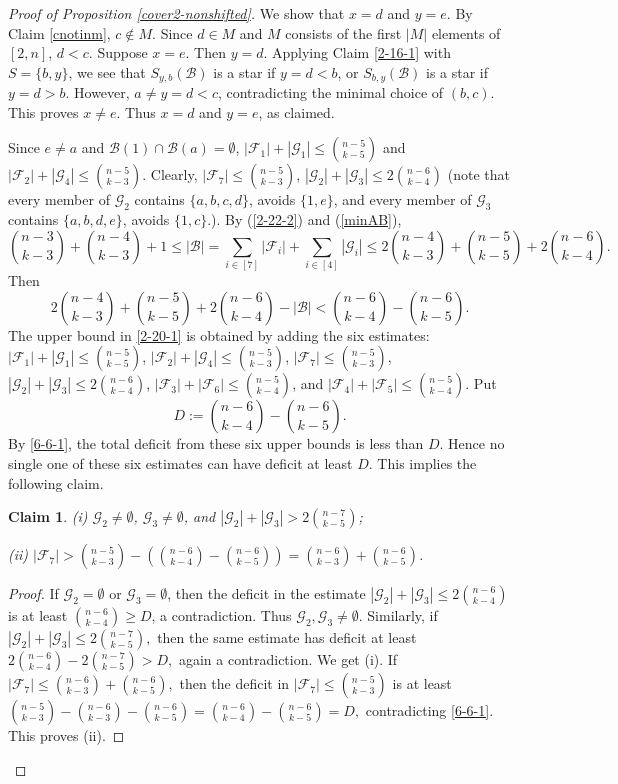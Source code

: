 \documentclass[a4paper,11pt]{article}
\newtheorem{claim}[theorem]{Claim}
\newcommand{\m}{\mathcal}
\begin{document}
\begin{proof}[Proof of Proposition \ref{cover2-nonshifted}]
We show that $x=d$ and $y=e.$ 
By Claim \ref{cnotinm}, $c\not\in M$. Since $d\in M$ and $M$ consists of the first $|M|$ elements of $[2,n]$, $d<c$. 
Suppose $x=e$. Then $y=d$. Applying Claim \ref{2-16-1} with $S=\{b,y\}$, we see that $S_{y,b}(\m B)$ is a star if $y=d<b$, or 
$S_{b,y}(\m B)$ is a star if $y=d>b$. However, $a\ne y=d<c$, contradicting the minimal choice of $(b,c)$. This proves $x\ne e$. Thus $x=d$ and $y=e$, as claimed.  

Since $e\ne a$ and $\m B(1)\cap \m B(a)=\emptyset$, $|\m F_1|+|\m G_1|\le {n-5\choose k-5}$ and $|\m F_2|+|\m G_4|\le {n-5\choose k-3}$.
Clearly, $|\m F_7|\le {n-5\choose k-3}$, $|\m G_2|+|\m G_3|\le 2 {n-6\choose k-4}$ (note that every member of $\mathcal G_2$ contains $\{a,b,c,d\}$, avoids
$\{1,e\}$, and every member of $\mathcal G_3$ contains
$\{a,b,d,e\}$, avoids $\{1,c\}$.).
By (\ref{2-22-2}) and (\ref{minAB}),  
\begin{equation}\label{2-20-1}
   {n-3\choose k-3}+{n-4\choose k-3}+1 \le |\m B|=\sum_{i\in [7]}|\m F_i|+\sum_{i\in [4]}|\m G_i|\le 2{n-4\choose k-3}+{n-5\choose k-5}+2{n-6\choose k-4}.
\end{equation}
Then
\begin{equation}\label{6-6-1}
2{n-4\choose k-3}+{n-5\choose k-5}+2{n-6\choose k-4}-|\m B|< {n-6\choose k-4}-{n-6\choose k-5}.
\end{equation}
The upper bound in \eqref{2-20-1} is obtained by adding the six estimates: $|\m F_1|+|\m G_1|\le {n-5\choose k-5}$, $|\m F_2|+|\m G_4|\le {n-5\choose k-3}$, $|\m F_7|\le {n-5\choose k-3}$, $|\m G_2|+|\m G_3|\le 2 {n-6\choose k-4}$, $|\m F_3|+|\m F_6|\le {n-5\choose k-4}$, and $|\m F_4|+|\m F_5| \le {n-5\choose k-4}$. 
Put
\[
D:={n-6\choose k-4}-{n-6\choose k-5}.
\]
By \eqref{6-6-1}, the total deficit from these six upper bounds is less
than $D$. Hence no single one of these six estimates can have deficit at
least $D$.
This implies the following claim. 
\begin{claim}\label{6-6-2}
(i) $\m G_2\ne \emptyset$, $\m G_3\ne \emptyset$, and $|\m G_2|+|\m G_3|> 2 {n-7\choose k-5}$;

(ii) $ |\m F_7|>{n-5\choose k-3}-\left({n-6\choose k-4}-{n-6\choose k-5}\right)={n-6\choose k-3}+{n-6\choose k-5}$.
\end{claim}

\begin{proof}
If $\mathcal G_2=\emptyset$ or $\mathcal G_3=\emptyset$, then the deficit
in the estimate $|\mathcal G_2|+|\mathcal G_3|\le 2{n-6\choose k-4}$ is at least ${n-6\choose k-4}\ge D$, a contradiction. Thus
$\mathcal G_2,\mathcal G_3\ne\emptyset$.
Similarly, if $|\mathcal G_2|+|\mathcal G_3|\le 2{n-7\choose k-5},$ then the same estimate has deficit at least $2{n-6\choose k-4}-2{n-7\choose k-5}>D,$
again a contradiction. We get (i).
If $|\mathcal F_7|\le {n-6\choose k-3}+{n-6\choose k-5},$
then the deficit in $|\mathcal F_7|\le {n-5\choose k-3}$
is at least ${n-5\choose k-3}-{n-6\choose k-3}-{n-6\choose k-5}
=
{n-6\choose k-4}-{n-6\choose k-5}
=D,$
contradicting \eqref{6-6-1}. This proves (ii).
\end{proof}



\end{proof}
\end{document}

